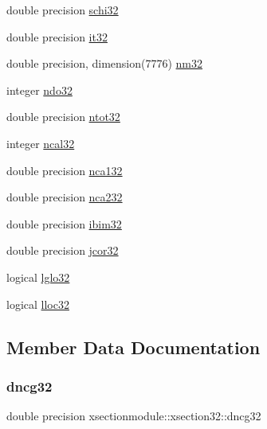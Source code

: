 \begin{DoxyCompactItemize}
\item 
double precision \hyperlink{structxsectionmodule_1_1xsection32_a5899b70f5c812c466a4a37aa9aaa42ff}{schi32}
\item 
double precision \hyperlink{structxsectionmodule_1_1xsection32_ace411213db5e57eeec7a3b9e460e7472}{it32}
\item 
double precision, dimension(7776) \hyperlink{structxsectionmodule_1_1xsection32_a516b0d40bb1cb22fe051674086dfc119}{nm32}
\item 
integer \hyperlink{structxsectionmodule_1_1xsection32_af02466b919829df9873a01c915fe874c}{ndo32}
\item 
double precision \hyperlink{structxsectionmodule_1_1xsection32_a019829f5e95e41393556b2509af3e0b5}{ntot32}
\item 
integer \hyperlink{structxsectionmodule_1_1xsection32_a523e34b859b2d5d585b7bda22880efd0}{ncal32}
\item 
double precision \hyperlink{structxsectionmodule_1_1xsection32_acd0be0069d253882705e9bd980d600f3}{nca132}
\item 
double precision \hyperlink{structxsectionmodule_1_1xsection32_a0346780e657e405eed176bdd35988f7c}{nca232}
\item 
double precision \hyperlink{structxsectionmodule_1_1xsection32_a918226a33e23a1a1ade6817f74c020a3}{ibim32}
\item 
double precision \hyperlink{structxsectionmodule_1_1xsection32_abf02e19a03e040e01a7a5579c1bcc6bf}{jcor32}
\item 
logical \hyperlink{structxsectionmodule_1_1xsection32_a9b1b21212abfa8e9e8d51fcffe1e3a1e}{lglo32}
\item 
logical \hyperlink{structxsectionmodule_1_1xsection32_ac6ed7a3c1236acc03bd542f73c2119e8}{lloc32}
\end{DoxyCompactItemize}


\subsection{Member Data Documentation}
\mbox{\label{structxsectionmodule_1_1xsection32_a369967442c04621850c99495f58834d2}} 
\subsubsection{\texorpdfstring{dncg32}{dncg32}}
{\footnotesize\ttfamily double precision xsectionmodule\+::xsection32\+::dncg32}

